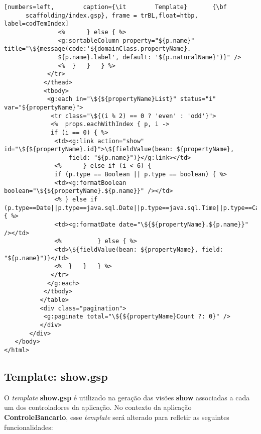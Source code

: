 \begin{lstlisting}[numbers=left,        caption={\it        Template}       {\bf
      scaffolding/index.gsp}, frame = trBL,float=htbp, label=codTemIndex]
               <%      } else { %>
               <g:sortableColumn property="${p.name}" title="\${message(code:'${domainClass.propertyName}.
               ${p.name}.label', default: '${p.naturalName}')}" />
               <%  }   }   } %>
            </tr>
           </thead>
           <tbody>
            <g:each in="\${${propertyName}List}" status="i" var="${propertyName}">
             <tr class="\${(i % 2) == 0 ? 'even' : 'odd'}">
             <%  props.eachWithIndex { p, i ->
             if (i == 0) { %>
              <td><g:link action="show" id="\${${propertyName}.id}">\${fieldValue(bean: ${propertyName}, 
                  field: "${p.name}")}</g:link></td>
              <%      } else if (i < 6) {
              if (p.type == Boolean || p.type == boolean) { %>
              <td><g:formatBoolean boolean="\${${propertyName}.${p.name}}" /></td>
              <% } else if (p.type==Date||p.type==java.sql.Date||p.type==java.sql.Time||p.type==Calendar) { %>
              <td><g:formatDate date="\${${propertyName}.${p.name}}" /></td>
              <%          } else { %>
              <td>\${fieldValue(bean: ${propertyName}, field: "${p.name}")}</td>
              <%  }   }   } %>
             </tr>
            </g:each>
           </tbody>
          </table>
          <div class="pagination">
           <g:paginate total="\${${propertyName}Count ?: 0}" />
          </div>
       </div>
   </body>
</html>
\end{lstlisting}

\subsection{Template: show.gsp}

\vspace{0.5cm}

O {\it  template} {\bf show.gsp}  é utilizado na  geração das visões  {\bf show}
associadas a cada  um dos controladores da aplicação.   No contexto da aplicação
{\bf  ControleBancario}, esse  {\it  template} será  alterado  para refletir  as
seguintes funcionalidades:

\vspace{0.3cm}

